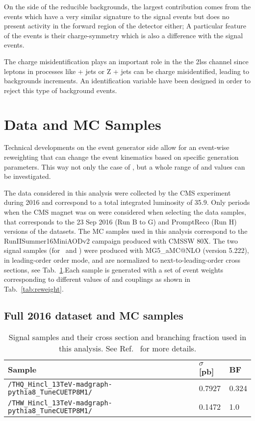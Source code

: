 On the side of the reducible backgrounds, the largest contribution comes from the \ttbar events which have a very similar signature to the signal events but does no present activity in the forward region of the detector either; A particular feature of the \ttbar events is their charge-symmetry which is also a difference with the signal events.

The charge misidentification plays an important role in the the 2lss channel since leptons in processes like \ttbar + jets or Z + jets can be charge misidentified, leading to backgrounds increments. An identification variable have been designed in order to reject this type of background events.         

\section{Data and MC Samples}
\label{secc:samples}

Technical developments on the event generator side allow for an event-wise reweighting that can change the event kinematics based on specific generation parameters. This way not only the case of , but a whole range of \Ct and \CV values can be investigated.




The data considered in this analysis were collected by the CMS experiment during 2016 and correspond to a total integrated luminosity of 35.9\fbinv. Only periods when the CMS magnet was on were considered when selecting the data samples, that corresponds to the 23 Sep 2016 (Run B to G) and PromptReco (Run H) versions of the datasets. The MC samples used in this analysis correspond to the RunIISummer16MiniAODv2 campaign produced with CMSSW 80X. The two signal samples (for \tHq\ and \tHW) were produced with \textsc{MG5\_}a\textsc{MC@NLO} (version 5.222), in leading-order order mode, and are normalized to next-to-leading-order cross sections, see Tab.~\ref{tab:sigsamples}.Each sample is generated with a set of event weights corresponding to different values of \Ct and \CV couplings as shown in Tab.~\ref{tab:reweight}.

\subsection{Full 2016 dataset and MC samples}
\begin{table}[ht!]
\centering \small
\begin{tabular}{lll}
Sample & $\sigma$ [pb] & BF \\ \hline
\verb|/THQ_Hincl_13TeV-madgraph-pythia8_TuneCUETP8M1/| & 0.7927 & 0.324 \\
\verb|/THW_Hincl_13TeV-madgraph-pythia8_TuneCUETP8M1/| & 0.1472 & 1.0   \\\hline
\end{tabular}
\caption[Signal samples and their cross section and branching fraction.]{Signal samples and their cross section and branching fraction used in this analysis. See Ref.~\cite{THQProdTwiki} for more details.}\label{tab:sigsamples}
\end{table}


